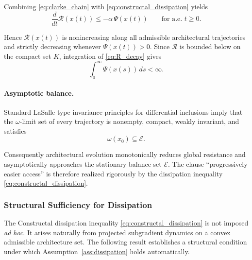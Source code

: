 \documentclass[12pt]{article}
\theoremstyle{plain}
\theoremstyle{definition}
\theoremstyle{remark}
\begin{document}
Combining \eqref{eq:clarke_chain} with
\eqref{eq:constructal_dissipation} yields
\begin{equation}
\frac{d}{dt}\mathcal R(x(t))
\le
-\alpha\,\Psi(x(t))
\qquad \text{for a.e. } t\ge0 .
\label{eq:R_decay}
\end{equation}

Hence $\mathcal R(x(t))$ is nonincreasing along all admissible
architectural trajectories and strictly decreasing whenever
$\Psi(x(t))>0$.
Since $\mathcal R$ is bounded below on the compact set $K$, integration
of \eqref{eq:R_decay} gives
\begin{equation}
\int_0^\infty \Psi(x(s))\,ds < \infty .
\label{eq:psi_integrable}
\end{equation}

\paragraph{Asymptotic balance.}
Standard LaSalle-type invariance principles for differential inclusions
\cite{Clarke1983} imply that the $\omega$-limit set of every trajectory
is nonempty, compact, weakly invariant, and satisfies
\begin{equation}
\omega(x_0)\subseteq \mathcal E .
\label{eq:omega_subset_E}
\end{equation}

Consequently architectural evolution monotonically reduces global
resistance and asymptotically approaches the stationary balance set
$\mathcal E$.
The clause ``progressively easier access'' is therefore realized
rigorously by the dissipation inequality
\eqref{eq:constructal_dissipation}.



\subsubsection{Structural Sufficiency for Dissipation}
\label{subsubsec:dissipation_sufficiency}

The Constructal dissipation inequality
\eqref{eq:constructal_dissipation}
is not imposed \emph{ad hoc}. It arises naturally from projected
subgradient dynamics on a convex admissible architecture set.
The following result establishes a structural condition under which
Assumption~\ref{ass:dissipation} holds automatically.
\end{document}

